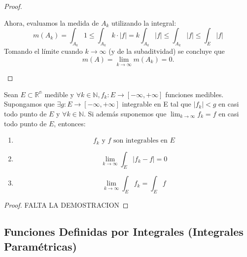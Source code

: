 \begin{proof}
\begin{enumerate}
        Ahora, evaluamos la medida de $ A_k $ utilizando la integral:  
        $$ m(A_k) = \int_{A_k} 1 \leq \int_{A_k} k \cdot |f| = k \int_{A_k} |f| \leq \int_{A_k} |f| \leq \int_E |f|$$  
        Tomando el límite cuando $ k \to \infty $ (y de la subaditvidad) se concluye que  
        $$ m(A) = \lim_{k \to \infty} m(A_k) = 0. $$  
    \end{enumerate}
\end{proof}
\begin{teorema}
    Sean $E \subset \mathbb{R^n}$ medible y $\forall k \in \mathbb{N}, f_k: E \to [-\infty, +\infty]$ funciones medibles. Supongamos que $\exists g: E \to [-\infty, +\infty]$ integrable en E tal que $|f_k| < g$ en casi todo punto de $E$ y $\forall k \in \mathbb{N}$. Si además suponemos que $\lim_{k \to \infty} f_k = f$ en casi todo punto de $E$, entonces: 
    \begin{enumerate}
        \item $$f_k \text{ y } f \text{ son integrables en }E$$
        \item $$\lim_{k \to \infty} \int_{E} |f_k - f| = 0$$
        \item $$\lim_{k \to \infty} \int_{E} f_k = \int_{E} f$$
    \end{enumerate}
\end{teorema}
\begin{proof}
    FALTA LA DEMOSTRACION
\end{proof}

\subsection{Funciones Definidas por Integrales (Integrales Paramétricas)}

